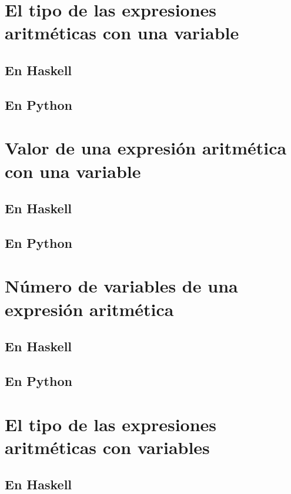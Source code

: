 \documentclass[a4paper,12pt,twoside]{book}
\begin{document}
\section{El tipo de las expresiones aritméticas con una variable}
\subsection{En Haskell}
\subsection{En Python}

\section{Valor de una expresión aritmética con una variable}
\subsection{En Haskell}
\subsection{En Python}

\section{Número de variables de una expresión aritmética}
\subsection{En Haskell}
\subsection{En Python}

\section{El tipo de las expresiones aritméticas con variables}
\subsection{En Haskell}
\end{document}
